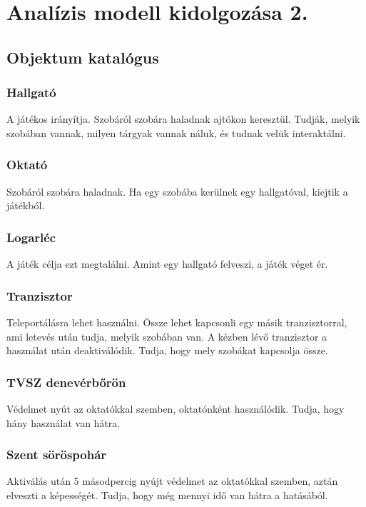 \chapter{Analízis modell kidolgozása 2.}

\section{Objektum katalógus}

\subsection{Hallgató}
A játékos irányítja. Szobáról szobára haladnak ajtókon keresztül. Tudják, melyik szobában vannak, milyen tárgyak vannak náluk, és tudnak velük interaktálni.

\subsection{Oktató}
Szobáról szobára haladnak. Ha egy szobába kerülnek egy hallgatóval, kiejtik a játékból. 

\subsection{Logarléc}
A játék célja ezt megtalálni. Amint egy hallgató felveszi, a játék véget ér.

\subsection{Tranzisztor}
Teleportálásra lehet használni. Össze lehet kapcsonli egy másik tranzisztorral, ami letevés után tudja, melyik szobában van. A kézben lévő tranzisztor a használat után deaktiválódik. Tudja, hogy mely szobákat kapcsolja össze.

\subsection{TVSZ denevérbőrön}
Védelmet nyút az oktatókkal szemben, oktatónként használódik. Tudja, hogy hány használat van hátra.

\subsection{Szent söröspohár}
Aktiválás után 5 másodpercig nyújt védelmet az oktatókkal szemben, aztán  elveszti a képességét. Tudja, hogy még mennyi idő van hátra a hatásából.

